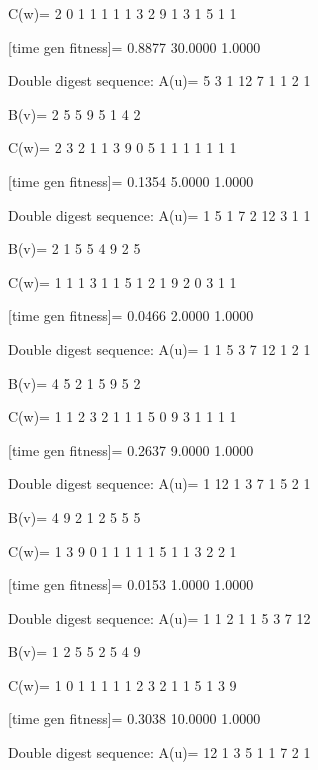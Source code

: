 C(w)=
     2     0     1     1     1     1     1     3     2     9     1     3     1     5     1     1

[time gen fitness]=
    0.8877   30.0000    1.0000

Double digest sequence:
A(u)=
     5     3     1    12     7     1     1     2     1

B(v)=
     2     5     5     9     5     1     4     2

C(w)=
     2     3     2     1     1     3     9     0     5     1     1     1     1     1     1     1

[time gen fitness]=
    0.1354    5.0000    1.0000

Double digest sequence:
A(u)=
     1     5     1     7     2    12     3     1     1

B(v)=
     2     1     5     5     4     9     2     5

C(w)=
     1     1     1     3     1     1     5     1     2     1     9     2     0     3     1     1

[time gen fitness]=
    0.0466    2.0000    1.0000

Double digest sequence:
A(u)=
     1     1     5     3     7    12     1     2     1

B(v)=
     4     5     2     1     5     9     5     2

C(w)=
     1     1     2     3     2     1     1     1     5     0     9     3     1     1     1     1

[time gen fitness]=
    0.2637    9.0000    1.0000

Double digest sequence:
A(u)=
     1    12     1     3     7     1     5     2     1

B(v)=
     4     9     2     1     2     5     5     5

C(w)=
     1     3     9     0     1     1     1     1     1     5     1     1     3     2     2     1

[time gen fitness]=
    0.0153    1.0000    1.0000

Double digest sequence:
A(u)=
     1     1     2     1     1     5     3     7    12

B(v)=
     1     2     5     5     2     5     4     9

C(w)=
     1     0     1     1     1     1     1     2     3     2     1     1     5     1     3     9

[time gen fitness]=
    0.3038   10.0000    1.0000

Double digest sequence:
A(u)=
    12     1     3     5     1     1     7     2     1

